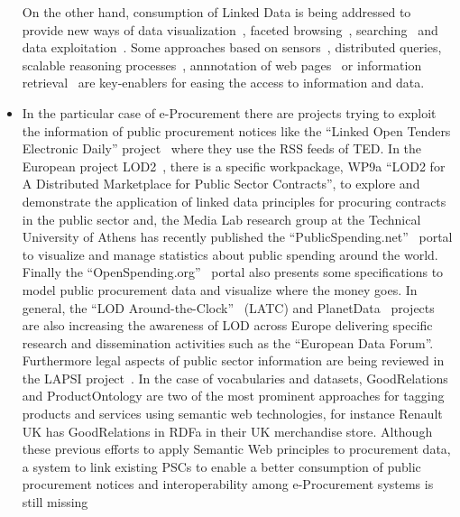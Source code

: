 \begin{itemize}
 On the other hand, consumption of Linked Data is being addressed to provide new ways of data 
 visualization~\cite{DBLP:journals/semweb/DadzieR11,hoga-etal-2011-swse-JWS}, faceted browsing~\cite{Pietriga06fresnel, citeulike:8529753,Sparallax}, 
 searching~\cite{hoga-etal-2011-swse-JWS} and data exploitation~\cite{Harth:2011:SIP:1963192.1963318}. Some approaches 
 based on sensors~\cite{Jeung:2010:EMM:1850003.1850235,ontology-search}, distributed queries\cite{Hartig09executingsparql,Ankolekar07thetwo,sparqlOpt}, 
 scalable reasoning processes~\cite{Urbani2010WebPIE,DBLP:conf/semweb/HoganPPD10}, 
 annnotation of web pages~\cite{rdfa-primer} or information retrieval~\cite{Pound} are key-enablers for easing the access 
 to information and data.
  
 \item In the particular case of e-Procurement there are projects trying to exploit the 
 information of public procurement notices like the ``Linked Open Tenders Electronic Daily'' project~\cite{loted} 
 where they use the RSS feeds of TED. In the European project LOD2~\cite{lod2-project}, there is a specific workpackage, 
 WP9a ``LOD2 for A Distributed Marketplace for Public Sector Contracts'', to explore and demonstrate the 
 application of linked data principles for procuring contracts in the public sector and, 
 the Media Lab research group at the Technical University of Athens has recently published the 
 ``PublicSpending.net''~\cite{publicspending} portal to visualize and manage statistics about public spending around the world. 
 Finally the ``OpenSpending.org''~\cite{open-spending} portal also presents some specifications to model public procurement data and 
 visualize where the money goes. In general, the ``LOD Around-the-Clock''~\cite{latc-project} (LATC) and PlanetData~\cite{planet-data-project} 
 projects are also increasing the awareness of LOD across Europe delivering specific research and dissemination activities such as the 
 ``European Data Forum''. Furthermore legal aspects of public sector information are being reviewed in the 
 LAPSI project~\cite{lapsi-project}. In the case of vocabularies and datasets, GoodRelations and ProductOntology are two of 
 the most prominent approaches for tagging products and services using semantic web technologies, 
 for instance Renault UK has GoodRelations in RDFa in their UK merchandise store. Although these previous efforts to apply Semantic Web 
 principles to procurement data, a system to link existing PSCs to enable a better consumption of 
 public procurement notices and interoperability among e-Procurement systems is still missing 

\end{itemize}

